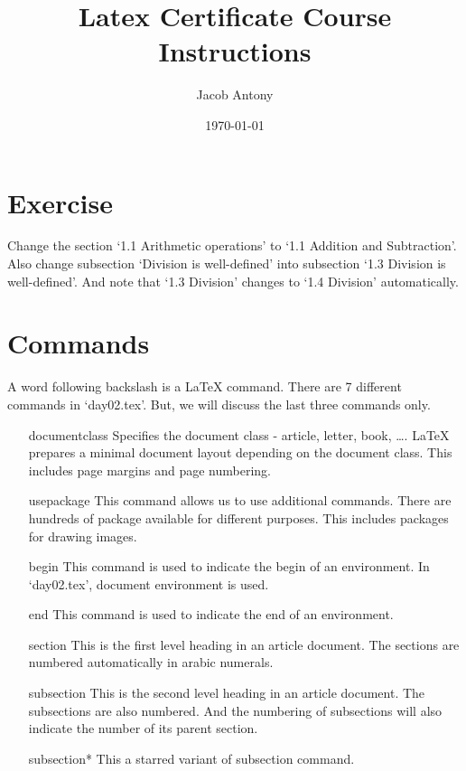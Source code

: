 \documentclass{article}
\title{Latex Certificate Course Instructions}
\author{Jacob Antony}
\date{\today}
\begin{document}
\maketitle

\section{Exercise}
Change the section `1.1 Arithmetic operations' to `1.1 Addition and Subtraction'. Also change subsection `Division is well-defined' into subsection `1.3 Division is well-defined'. And note that `1.3 Division' changes to `1.4 Division' automatically.

\section{Commands}
	A word following backslash is a \LaTeX{} command. There are 7 different commands in `day02.tex'. But, we will discuss the last three commands only.
	\begin{enumerate}
		\item[documentclass] Specifies the document class - article, letter, book, \dots. \LaTeX{} prepares a minimal document layout depending on the document class. This includes page margins and page numbering.
		\item[usepackage] This command allows us to use additional commands. There are hundreds of package available for different purposes. This includes packages for drawing images.
		\item[begin] This command is used to indicate the begin of an environment. In `day02.tex', document environment is used.
		\item[end] This command is used to indicate the end of an environment. 
		\item[section] This is the first level heading in an article document. The sections are numbered automatically in arabic numerals.
		\item[subsection] This is the second level heading in an article document. The subsections are also numbered. And the numbering of subsections will also indicate the number of its parent section.
		\item[subsection*] This a starred variant of subsection command.
	\end{enumerate}
\end{document}
